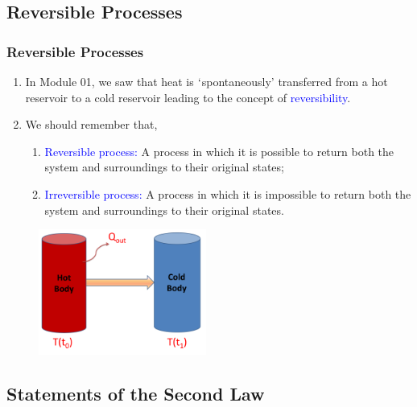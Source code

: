 \documentclass[10pt,compress]{beamer}
\begin{document}
\subsection{Reversible Processes}
\begin{frame}
 \frametitle{Reversible Processes}
   \begin{enumerate}
     \item<1-> In Module 01, we saw that heat is $\lq$spontaneously' transferred from a hot reservoir to a cold reservoir leading to the concept of \textcolor{blue}{reversibility}.
     \item<2-> We should remember that,
       \begin{enumerate}
         \item<2-> \textcolor{blue}{Reversible process:} A process in which it is possible to return both the system and surroundings to their original states;
         \item<3-> \textcolor{blue}{Irreversible process:} A process in which it is impossible to return both the system and surroundings to their original states.
       \end{enumerate}
    \end{enumerate}
    \begin{figure}%
     \begin{center}
      \includegraphics[width=5.5cm,clip]{./Pics/HotColdCoffee}
     \end{center}
    \end{figure}

\end{frame}

\subsection{Statements of the Second Law}
\end{document}

